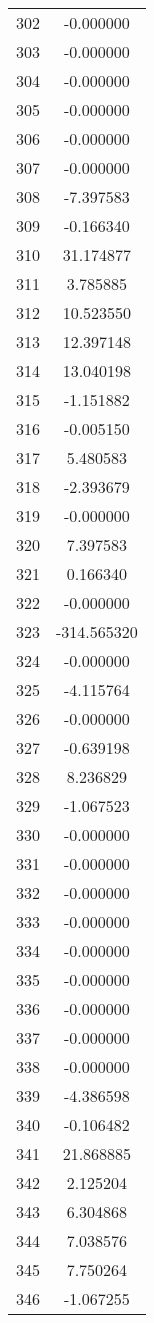 \documentclass[12pt]{article}
\begin{document}
\begin{longtable}{@{}cc@{}}
302 & -0.000000 \\
303 & -0.000000 \\
304 & -0.000000 \\
305 & -0.000000 \\
306 & -0.000000 \\
307 & -0.000000 \\
308 & -7.397583 \\
309 & -0.166340 \\
310 & 31.174877 \\
311 & 3.785885 \\
312 & 10.523550 \\
313 & 12.397148 \\
314 & 13.040198 \\
315 & -1.151882 \\
316 & -0.005150 \\
317 & 5.480583 \\
318 & -2.393679 \\
319 & -0.000000 \\
320 & 7.397583 \\
321 & 0.166340 \\
322 & -0.000000 \\
323 & -314.565320 \\
324 & -0.000000 \\
325 & -4.115764 \\
326 & -0.000000 \\
327 & -0.639198 \\
328 & 8.236829 \\
329 & -1.067523 \\
330 & -0.000000 \\
331 & -0.000000 \\
332 & -0.000000 \\
333 & -0.000000 \\
334 & -0.000000 \\
335 & -0.000000 \\
336 & -0.000000 \\
337 & -0.000000 \\
338 & -0.000000 \\
339 & -4.386598 \\
340 & -0.106482 \\
341 & 21.868885 \\
342 & 2.125204 \\
343 & 6.304868 \\
344 & 7.038576 \\
345 & 7.750264 \\
346 & -1.067255 \\

\end{longtable}
\end{document}
